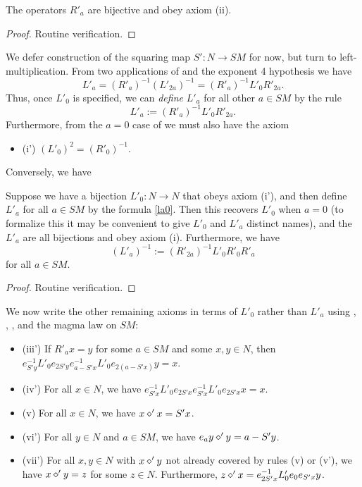 \begin{lemma}\label{ra-prop}\leanok  The operators $R'_a$ are bijective and obey axiom (ii).
\end{lemma}

\begin{proof}\leanok Routine verification.
\end{proof}

We defer construction of the squaring map $S': N \to SM$ for now, but turn to left-multiplication. From two applications of  and the exponent 4 hypothesis we have
$$ L'_a = (R'_a)^{-1} (L'_{2a})^{-1} = (R'_a)^{-1} L'_0 R'_{2a}.$$
Thus, once $L'_0$ is specified, we can \emph{define} $L'_a$ for all other $a \in SM$ by the rule
\begin{equation}\label{la0}
  L'_a := (R'_a)^{-1} L'_0 R'_{2a}.
\end{equation}
Furthermore, from the $a=0$ case of  we must also have the axiom
\begin{itemize}
  \item (i') $(L'_0)^2 = (R'_0)^{-1}$.
\end{itemize}

Conversely, we have

\begin{lemma}\label{l0-la}\leanok  Suppose we have a bijection $L'_0: N \to N$ that obeys axiom (i'), and then define $L'_a$ for all $a \in SM$ by the formula \eqref{la0}.  Then this recovers $L'_0$ when $a=0$ (to formalize this it may be convenient to give $L'_0$ and $L'_a$ distinct names), and the $L'_a$ are all bijections and obey axiom (i).  Furthermore, we have
\begin{equation}\label{la1}
  (L'_a)^{-1} := (R'_{2a})^{-1} L'_0 R'_0 R'_{a}
\end{equation}
for all $a \in SM$.
\end{lemma}

\begin{proof}\leanok Routine verification.
\end{proof}

We now write the other remaining axioms in terms of $L'_0$ rather than $L'_a$ using , , , and the magma law on $SM$:
\begin{itemize}
\item (iii')  If $R'_a x = y$ for some $a \in SM$ and some $x,y \in N$, then $e_{S'y}^{-1} L'_0 e_{2S'y} e_{a - S'x}^{-1} L'_0 e_{2(a - S'x)} y = x$.
\item (iv')  For all $x \in N$, we have $e_{S'x}^{-1} L'_0 e_{2S'x} e_{S'x}^{-1} L'_0 e_{2S'x} x = x$.
\item (v)  For all $x \in N$, we have $x \diamond' x = S'x$.
\item (vi')  For all $y \in N$ and $a \in SM$, we have $e_a y \diamond' y = a - S'y$.
\item (vii')  For all $x,y \in N$ with $x \diamond' y$ not already covered by rules (v) or (v'), we have $x \diamond' y = z$ for some $z \in N$.  Furthermore, $z \diamond' x = e_{2S'x}^{-1} L'_0 e_0 e_{S'x} y$.
\end{itemize}

